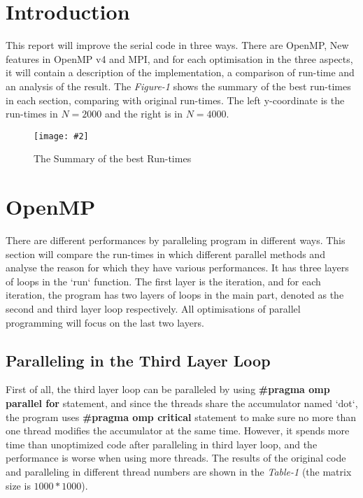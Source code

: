 \documentclass[10pt, a4paper]{article}
\title{\mytitle}
\author{\myauthor\hspace{1em}}
\newcommand{\figuremacro}[5]{
    \begin{figure}[#1]
        \centering
        \texttt{[image: \#2]}
        \caption[#3]{\textbf{#3}#4}
        \label{fig:#2}
    \end{figure}
}
\begin{document}
	\maketitle

    \section{Introduction}
 	
    This report will improve the serial code in three ways. There are OpenMP, New features in OpenMP v4 and MPI, and for each optimisation in the three aspects, it will contain a description of the implementation, a comparison of run-time and an analysis of the result. The \textit{Figure-1} shows the summary of the best run-times in each section, comparing with original run-times. The left y-coordinate is the run-times in $N=2000$ and the right is in $N=4000$.
    
    \figuremacro{h}{figure1}{}{ The Summary of the best Run-times }{1.0}

    
    
	\section{OpenMP}
	
    There are different performances by paralleling program in different ways. This section will compare the run-times in which different parallel methods and analyse the reason for which they have various performances. It has three layers of loops in the `run` function. The first layer is the iteration, and for each iteration, the program has two layers of loops in the main part, denoted as the second and third layer loop respectively. All optimisations of parallel programming will focus on the last two layers.
	
	\subsection{Paralleling in the Third Layer Loop}
 
    First of all, the third layer loop can be paralleled by using \textbf{\#pragma omp parallel for} statement, and since the threads share the accumulator named `dot`, the program uses \textbf{\#pragma omp critical} statement to make sure no more than one thread modifies the accumulator at the same time. However, it spends more time than unoptimized code after paralleling in third layer loop, and the performance is worse when using more threads. The results of the original code and paralleling in different thread numbers are shown in the \textit{Table-1} (the matrix size is $1000*1000$).
    
\end{document}
